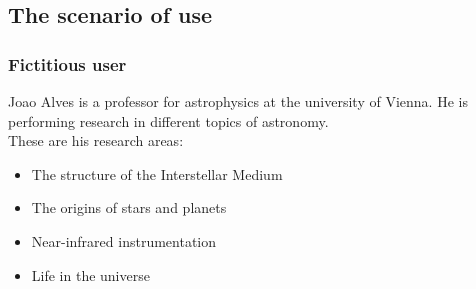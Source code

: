 \documentclass{article}
\begin{document}
\subsection{The scenario of use}
\subsubsection {Fictitious user}

Joao Alves is a professor for astrophysics at the university of Vienna. He is performing research in different topics of astronomy.
\\ These are his research areas:
\begin{itemize}
\item The structure of the Interstellar Medium
\item The origins of stars and planets
\item Near-infrared instrumentation
\item Life in the universe
\end{itemize}
\end{document}
